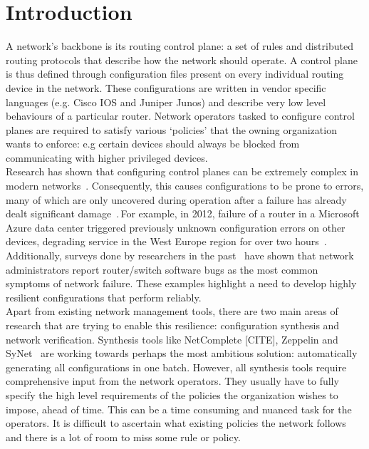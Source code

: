 \section{Introduction}

A network's backbone is its routing control plane: a set of rules and distributed routing protocols that describe how the network should operate. A control plane is thus defined through configuration files present on every individual routing device in the network. These configurations are written in vendor specific languages (e.g. Cisco IOS and Juniper Junos) and describe very low level behaviours of a particular router. Network operators tasked to configure control planes are required to satisfy various `policies' that the owning organization wants to enforce: e.g certain devices should always be blocked from communicating with higher privileged devices.\\

Research has shown that configuring control planes can be extremely complex in modern networks~\cite{complexity}. Consequently, this causes configurations to be prone to errors, many of which are only uncovered during operation after a failure has already dealt significant damage~\cite{errors}. For example, in 2012, failure of a router in a Microsoft Azure data center triggered previously unknown configuration errors on other devices, degrading service in the West Europe region for over two hours~\cite{azure}. Additionally, surveys done by researchers in the past~\cite{Zeng} have shown that network administrators report router/switch software bugs as the most common symptoms of network failure. These examples highlight a need to develop highly resilient configurations that perform reliably.\\  

Apart from existing network management tools, there are two main areas of research that are trying to enable this resilience: configuration synthesis and network verification. Synthesis tools like NetComplete [CITE], Zeppelin and SyNet~\cite{synet} are working towards perhaps the most ambitious solution: automatically generating all configurations in one batch. However, all synthesis tools require comprehensive input from the network operators. They usually have to fully specify the high level requirements of the policies the organization wishes to impose, ahead of time. This can be a time consuming and nuanced task for the operators. It is difficult to ascertain what existing policies the network follows and there is a lot of room to miss some rule or policy.


